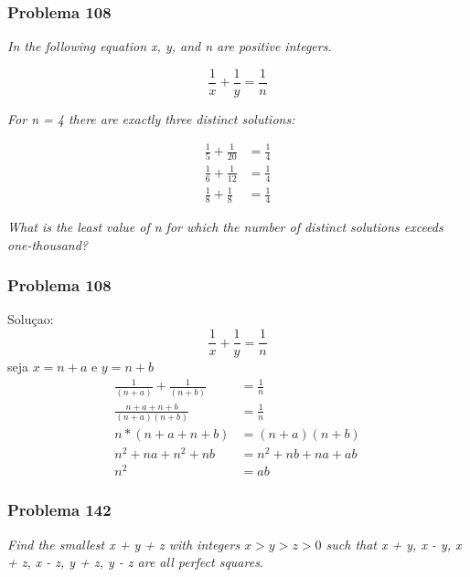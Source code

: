 \documentclass{beamer}
\begin{document}
\begin{frame}
    \frametitle{Problema 108}

    \begin{center}
        \textit{
            In the following equation x, y, and n are positive integers.
        }
    \end{center}

    \begin{equation}
        \frac{1}{x} + \frac{1}{y} = \frac{1}{n}
    \end{equation}

    \begin{center}
        \textit{
            For n = 4 there are exactly three distinct solutions:
        }
    \end{center}

    \begin{align}
        \frac{1}{5} + \frac{1}{20} & = \frac{1}{4} \\
        \frac{1}{6} + \frac{1}{12} & = \frac{1}{4} \\
        \frac{1}{8} + \frac{1}{8}  & = \frac{1}{4}
    \end{align}

    \begin{center}
        \textit{
            What is the least value of n for which the number of distinct solutions exceeds one-thousand?
        }
    \end{center}
\end{frame}

\begin{frame}
    \frametitle{Problema 108}

    Soluçao:
    \begin{equation}
        \frac{1}{x} + \frac{1}{y} = \frac{1}{n}
    \end{equation}
    seja $x=n+a$ e $y=n+b$
    \begin{align}
        \frac{1}{(n+a)} + \frac{1}{(n+b)} & = \frac{1}{n}        \\
        \frac{n+a + n+b}{(n+a)(n+b)}      & = \frac{1}{n}        \\
        n*(n+a+n+b)                       & = (n+a)(n+b)         \\
        n^2 + na + n^2 + nb               & = n^2 + nb + na + ab \\
        n^2                               & = ab
    \end{align}
\end{frame}

\begin{frame}
    \frametitle{Problema 142}

    \begin{center}
        \textit{
        Find the smallest x + y + z with integers $x > y > z > 0$ such that x + y, x - y, x + z, x - z, y + z, y - z are all perfect squares.
        }
    \end{center}
\end{frame}
\end{document}
